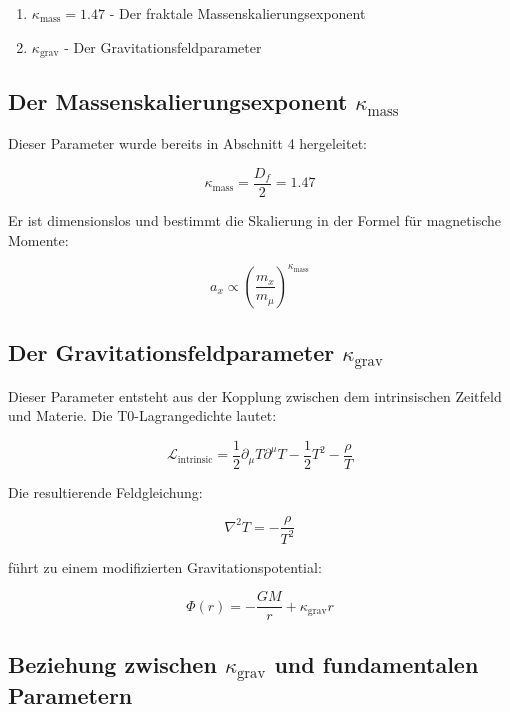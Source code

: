 \documentclass[12pt,a4paper]{article}
\begin{document}
	\begin{enumerate}
		\item $\kappa_{\text{mass}} = 1.47$ - Der fraktale Massenskalierungsexponent
		\item $\kappa_{\text{grav}}$ - Der Gravitationsfeldparameter
	\end{enumerate}
	
	\subsection{Der Massenskalierungsexponent $\kappa_{\text{mass}}$}
	
	Dieser Parameter wurde bereits in Abschnitt 4 hergeleitet:
	
	\begin{equation}
		\kappa_{\text{mass}} = \frac{D_f}{2} = 1.47
	\end{equation}
	
	Er ist dimensionslos und bestimmt die Skalierung in der Formel für magnetische Momente:
	
	\begin{equation}
		a_x \propto \left(\frac{m_x}{m_\mu}\right)^{\kappa_{\text{mass}}}
	\end{equation}
	
	\subsection{Der Gravitationsfeldparameter $\kappa_{\text{grav}}$}
	
	Dieser Parameter entsteht aus der Kopplung zwischen dem intrinsischen Zeitfeld und Materie. Die T0-Lagrangedichte lautet:
	
	\begin{equation}
		\mathcal{L}_{\text{intrinsic}} = \frac{1}{2}\partial_\mu T \partial^\mu T - \frac{1}{2}T^2 - \frac{\rho}{T}
	\end{equation}
	
	Die resultierende Feldgleichung:
	
	\begin{equation}
		\nabla^2 T = -\frac{\rho}{T^2}
	\end{equation}
	
	führt zu einem modifizierten Gravitationspotential:
	
	\begin{equation}
		\Phi(r) = -\frac{GM}{r} + \kappa_{\text{grav}} r
	\end{equation}
	
	\subsection{Beziehung zwischen $\kappa_{\text{grav}}$ und fundamentalen Parametern}
	
\end{document}

